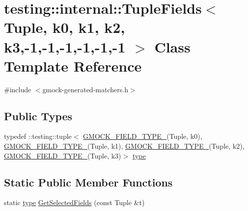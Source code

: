 \hypertarget{classtesting_1_1internal_1_1TupleFields_3_01Tuple_00_01k0_00_01k1_00_01k2_00_01k3_00-1_00-1_00-1_00-1_00-1_00-1_01_4}{}\section{testing\+:\+:internal\+:\+:Tuple\+Fields$<$ Tuple, k0, k1, k2, k3,-\/1,-\/1,-\/1,-\/1,-\/1,-\/1 $>$ Class Template Reference}
\label{classtesting_1_1internal_1_1TupleFields_3_01Tuple_00_01k0_00_01k1_00_01k2_00_01k3_00-1_00-1_00-1_00-1_00-1_00-1_01_4}


{\ttfamily \#include $<$gmock-\/generated-\/matchers.\+h$>$}

\subsection*{Public Types}
\begin{DoxyCompactItemize}
\item 
typedef \+::testing\+::tuple$<$ \hyperlink{gmock-generated-matchers_8h_acf3e27de83a73f0d873da1cd471e505b}{G\+M\+O\+C\+K\+\_\+\+F\+I\+E\+L\+D\+\_\+\+T\+Y\+P\+E\+\_\+}(Tuple, k0), \hyperlink{gmock-generated-matchers_8h_acf3e27de83a73f0d873da1cd471e505b}{G\+M\+O\+C\+K\+\_\+\+F\+I\+E\+L\+D\+\_\+\+T\+Y\+P\+E\+\_\+}(Tuple, k1), \hyperlink{gmock-generated-matchers_8h_acf3e27de83a73f0d873da1cd471e505b}{G\+M\+O\+C\+K\+\_\+\+F\+I\+E\+L\+D\+\_\+\+T\+Y\+P\+E\+\_\+}(Tuple, k2), \hyperlink{gmock-generated-matchers_8h_acf3e27de83a73f0d873da1cd471e505b}{G\+M\+O\+C\+K\+\_\+\+F\+I\+E\+L\+D\+\_\+\+T\+Y\+P\+E\+\_\+}(Tuple, k3)$>$ \hyperlink{classtesting_1_1internal_1_1TupleFields_3_01Tuple_00_01k0_00_01k1_00_01k2_00_01k3_00-1_00-1_00-1_00-1_00-1_00-1_01_4_a9e082889b5cbbbc44c95a2cec23d4646}{type}
\end{DoxyCompactItemize}
\subsection*{Static Public Member Functions}
\begin{DoxyCompactItemize}
\item 
static \hyperlink{classtesting_1_1internal_1_1TupleFields_3_01Tuple_00_01k0_00_01k1_00_01k2_00_01k3_00-1_00-1_00-1_00-1_00-1_00-1_01_4_a9e082889b5cbbbc44c95a2cec23d4646}{type} \hyperlink{classtesting_1_1internal_1_1TupleFields_3_01Tuple_00_01k0_00_01k1_00_01k2_00_01k3_00-1_00-1_00-1_00-1_00-1_00-1_01_4_a3ef0caad002de28085c87c65fcca983a}{Get\+Selected\+Fields} (const Tuple \&t)
\end{DoxyCompactItemize}


